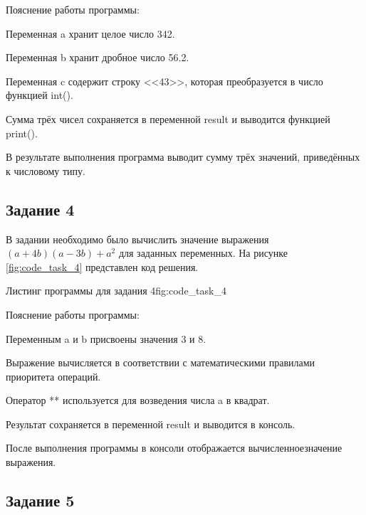 \documentclass[]{vvsu}
\begin{document}
Пояснение работы программы:
\begin{vvsu_list}
  \item Переменная a хранит целое число 342.
  \item Переменная b хранит дробное число 56.2.
  \item Переменная c содержит строку <<43>>, которая преобразуется в число \linebreak функцией int().
  \item Сумма трёх чисел сохраняется в переменной result и выводится функцией print().
\end{vvsu_list}

В результате выполнения программа выводит сумму трёх значений, приведённых к числовому типу.

\subsection{Задание 4}

В задании необходимо было вычислить значение выражения $(a + 4b)(a - 3b) + a^2$ для заданных переменных. На рисунке \ref{fig:code_task_4} представлен код решения.

\begin{vvsu_figure}{Листинг программы для задания 4}{fig:code_task_4}
  \begin{minipage}{.75\textwidth}
    
  \end{minipage}
\end{vvsu_figure}

Пояснение работы программы:
\begin{vvsu_list}
  \item Переменным a и b присвоены значения 3 и 8.
  \item Выражение вычисляется в соответствии с математическими правилами приоритета операций.
  \item Оператор ** используется для возведения числа a в квадрат.
  \item Результат сохраняется в переменной result и выводится в консоль.
\end{vvsu_list}

После выполнения программы в консоли отображается вычисленное\linebreak значение выражения.

\subsection{Задание 5}
\end{document}
